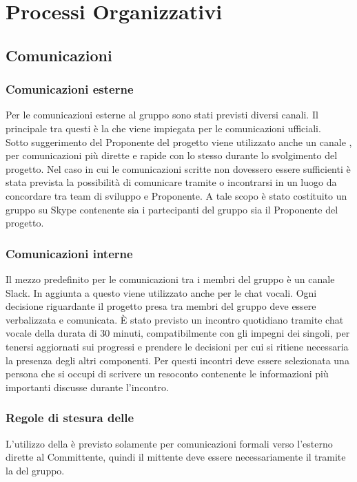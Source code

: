 \section{Processi Organizzativi}

\subsection{Comunicazioni}

\subsubsection{Comunicazioni esterne}
Per le comunicazioni esterne al gruppo sono stati previsti diversi canali.
Il principale tra questi è la \email{} \href{mailto:\GroupEmail}{\GroupEmail}{} che viene impiegata per le comunicazioni ufficiali.\\
Sotto suggerimento del Proponente del progetto viene utilizzato anche un canale , per comunicazioni più dirette e rapide con lo stesso durante lo svolgimento del progetto. Nel caso in cui le comunicazioni scritte non dovessero essere sufficienti è stata prevista la possibilità di comunicare tramite  o incontrarsi in un luogo da concordare tra team di sviluppo e Proponente. A tale scopo è stato costituito un gruppo su Skype contenente sia i partecipanti del gruppo sia il Proponente del progetto.

\subsubsection{Comunicazioni interne} \label{sec:comunicazioni_interne}
Il mezzo predefinito per le comunicazioni tra i membri del gruppo è un canale Slack.
In aggiunta a questo viene utilizzato anche  per le chat vocali.
Ogni decisione riguardante il progetto presa tra membri del gruppo deve essere verbalizzata e comunicata.
\`{E} stato previsto un incontro quotidiano tramite chat vocale della durata di 30 minuti, compatibilmente con gli impegni dei singoli, per tenersi aggiornati sui progressi e prendere le decisioni per cui si ritiene necessaria la presenza degli altri componenti. Per questi incontri deve essere selezionata una persona che si occupi di scrivere un resoconto contenente le informazioni più importanti discusse durante l'incontro.

\subsubsection{Regole di stesura delle \email}
L'utilizzo della \email{} è previsto solamente per comunicazioni formali verso l'esterno dirette al Committente, quindi il mittente deve essere necessariamente il \Responsabile{} tramite la \email{} del gruppo.

